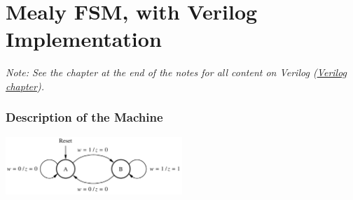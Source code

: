 \documentclass[12pt,openany]{book}
\begin{document}
\section{Mealy FSM, with Verilog Implementation}
 \textit{Note: See the chapter at the end of the notes for all content on Verilog (\hyperref[Verilog]{Verilog chapter}).}

\subsubsection*{Description of the Machine}
\begin{center}
	\includegraphics[width=0.5\textwidth]{circuits/17.2.png}
\end{center}
\end{document}
